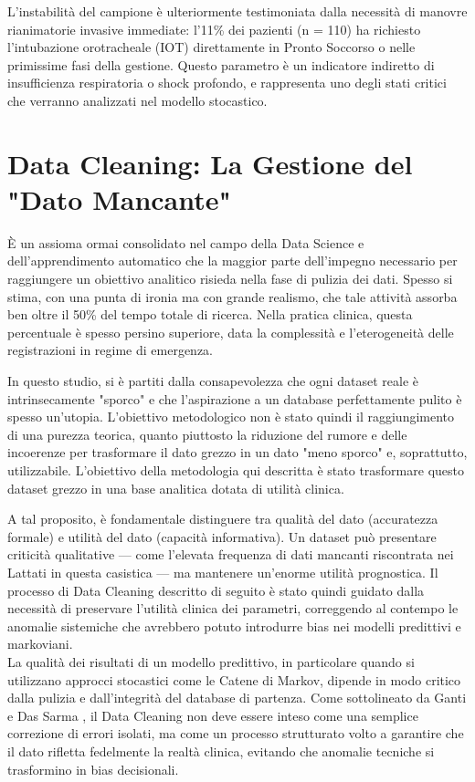 \documentclass[11pt, oneside, noexaminfo]{sapthesis}   	%
\begin{document}
L'instabilità del campione è ulteriormente testimoniata dalla necessità di manovre rianimatorie invasive immediate: l'11\% dei pazienti (n = 110) ha richiesto l'intubazione orotracheale (IOT) direttamente in Pronto Soccorso o nelle primissime fasi della gestione. Questo parametro è un indicatore indiretto di insufficienza respiratoria o shock profondo, e rappresenta uno degli stati critici che verranno analizzati nel modello stocastico.

\section{Data Cleaning: La Gestione del "Dato Mancante"}
È un assioma ormai consolidato nel campo della Data Science e dell'apprendimento automatico che la maggior parte dell'impegno necessario per raggiungere un obiettivo analitico risieda nella fase di pulizia dei dati. Spesso si stima, con una punta di ironia ma con grande realismo, che tale attività assorba ben oltre il 50\% del tempo totale di ricerca. Nella pratica clinica, questa percentuale è spesso persino superiore, data la complessità e l'eterogeneità delle registrazioni in regime di emergenza.

In questo studio, si è partiti dalla consapevolezza che ogni dataset reale è intrinsecamente "sporco" e che l'aspirazione a un database perfettamente pulito è spesso un'utopia. L'obiettivo metodologico non è stato quindi il raggiungimento di una purezza teorica, quanto piuttosto la riduzione del rumore e delle incoerenze per trasformare il dato grezzo in un dato "meno sporco" e, soprattutto, utilizzabile. 
L'obiettivo della metodologia qui descritta è stato trasformare questo dataset grezzo in una base analitica dotata di utilità clinica.

A tal proposito, è fondamentale distinguere tra qualità del dato (accuratezza formale) e utilità del dato (capacità informativa). Un dataset può presentare criticità qualitative — come l'elevata frequenza di dati mancanti riscontrata nei Lattati in questa casistica — ma mantenere un'enorme utilità prognostica. Il processo di Data Cleaning descritto di seguito è stato quindi guidato dalla necessità di preservare l'utilità clinica dei parametri, correggendo al contempo le anomalie sistemiche che avrebbero potuto introdurre bias nei modelli predittivi e markoviani.\\

La qualità dei risultati di un modello predittivo, in particolare quando si utilizzano approcci stocastici come le Catene di Markov, dipende in modo critico dalla pulizia e dall'integrità del database di partenza. Come sottolineato da Ganti e Das Sarma \cite{ganti2013datacleaning}, il Data Cleaning non deve essere inteso come una semplice correzione di errori isolati, ma come un processo strutturato volto a garantire che il dato rifletta fedelmente la realtà clinica, evitando che anomalie tecniche si trasformino in bias decisionali.
\end{document}
